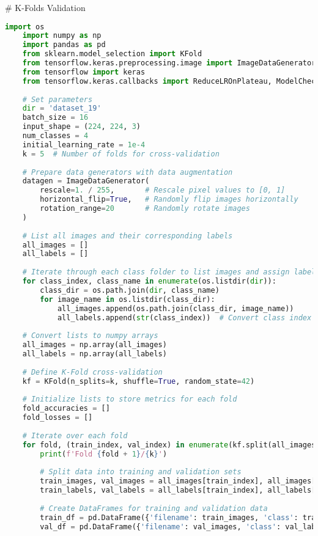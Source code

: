 # K-Folds Validation
\begin{lstlisting}[language=Python]
    import os
    import numpy as np
    import pandas as pd
    from sklearn.model_selection import KFold
    from tensorflow.keras.preprocessing.image import ImageDataGenerator
    from tensorflow import keras
    from tensorflow.keras.callbacks import ReduceLROnPlateau, ModelCheckpoint, EarlyStopping
    
    # Set parameters
    dir = 'dataset_19'
    batch_size = 16
    input_shape = (224, 224, 3)
    num_classes = 4
    initial_learning_rate = 1e-4
    k = 5  # Number of folds for cross-validation
    
    # Prepare data generators with data augmentation
    datagen = ImageDataGenerator(
        rescale=1. / 255,       # Rescale pixel values to [0, 1]
        horizontal_flip=True,   # Randomly flip images horizontally
        rotation_range=20       # Randomly rotate images
    )
    
    # List all images and their corresponding labels
    all_images = []
    all_labels = []
    
    # Iterate through each class folder to list images and assign labels
    for class_index, class_name in enumerate(os.listdir(dir)):
        class_dir = os.path.join(dir, class_name)
        for image_name in os.listdir(class_dir):
            all_images.append(os.path.join(class_dir, image_name))
            all_labels.append(str(class_index))  # Convert class index to string
    
    # Convert lists to numpy arrays
    all_images = np.array(all_images)
    all_labels = np.array(all_labels)
    
    # Define K-Fold cross-validation
    kf = KFold(n_splits=k, shuffle=True, random_state=42)
    
    # Initialize lists to store metrics for each fold
    fold_accuracies = []
    fold_losses = []
    
    # Iterate over each fold
    for fold, (train_index, val_index) in enumerate(kf.split(all_images)):
        print(f'Fold {fold + 1}/{k}')
    
        # Split data into training and validation sets
        train_images, val_images = all_images[train_index], all_images[val_index]
        train_labels, val_labels = all_labels[train_index], all_labels[val_index]
    
        # Create DataFrames for training and validation data
        train_df = pd.DataFrame({'filename': train_images, 'class': train_labels})
        val_df = pd.DataFrame({'filename': val_images, 'class': val_labels})
    

\end{lstlisting}
